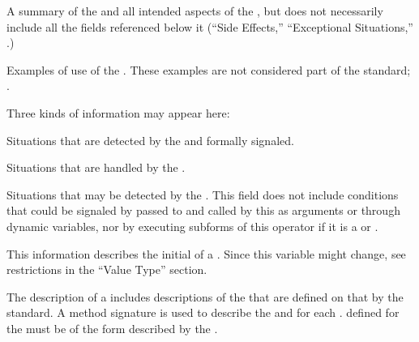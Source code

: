 \endsubsubsection%


A summary of the  and all intended aspects of the , 
but does not necessarily include all the fields referenced below it 
(``Side Effects,'' ``Exceptional Situations,'' \etc.)

\endsubsubsection%


Examples of use of the .
These examples are not considered part of the standard;
\seesection\RemovableText.

\endsubsubsection%


  Three kinds of information may appear here:
\beginlist
\item{\bull}
Situations that are detected by the  and formally signaled.
\item{\bull}
Situations that are handled by the .
\item{\bull}
Situations that may be detected by the .
\endlist
This field does not include conditions that could
be signaled by  passed to and called by this 
as arguments or through dynamic variables, nor by executing subforms of this
operator if it is a  or .

\endsubsubsection%


This information describes the initial  of a .
Since this variable might change, see  restrictions in the ``Value Type'' section.

\endsubsubsection%


The description of a  includes descriptions of the
 that are defined on that  by the standard.  
A method signature is used to describe the  and 
 for each . 
 defined for the  must be of the form described
by the  . 

